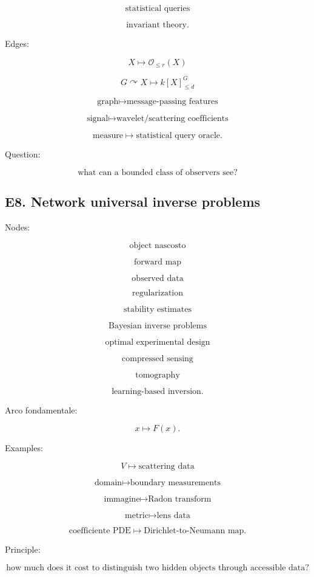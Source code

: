 \documentclass[11pt]{article}
\begin{document}
\[
\text{statistical queries}
\]

\[
\text{invariant theory}.
\]

Edges:

\[
X\mapsto \mathcal O_{\le r}(X)
\]

\[
G\curvearrowright X\mapsto k[X]^G_{\le d}
\]

\[
\text{graph}\mapsto \text{message-passing features}
\]

\[
\text{signal}\mapsto \text{wavelet/scattering coefficients}
\]

\[
\text{measure}\mapsto \text{statistical query oracle}.
\]

Question:

\[
\text{what can a bounded class of observers see?}
\]



\subsection{E8. Network universal inverse problems}

Nodes:

\[
\text{object nascosto}
\]

\[
\text{forward map}
\]

\[
\text{observed data}
\]

\[
\text{regularization}
\]

\[
\text{stability estimates}
\]

\[
\text{Bayesian inverse problems}
\]

\[
\text{optimal experimental design}
\]

\[
\text{compressed sensing}
\]

\[
\text{tomography}
\]

\[
\text{learning-based inversion}.
\]

Arco fondamentale:

\[
x\mapsto F(x).
\]

Examples:

\[
V\mapsto \text{scattering data}
\]

\[
\text{domain}\mapsto \text{boundary measurements}
\]

\[
\text{immagine}\mapsto \text{Radon transform}
\]

\[
\text{metric}\mapsto \text{lens data}
\]

\[
\text{coefficiente PDE}\mapsto \text{Dirichlet-to-Neumann map}.
\]

Principle:

\[
\text{how much does it cost to distinguish two hidden objects through accessible data?}
\]
\end{document}

